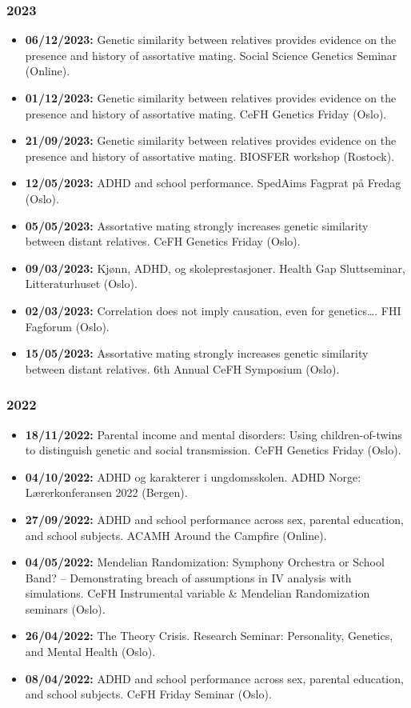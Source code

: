 \documentclass[10pt,a4paper]{article}
\begin{document}
\subsubsection*{2023}
\begin{itemize}
\item \textbf{06/12/2023:} Genetic similarity between relatives provides evidence on the presence and history of assortative mating. Social Science Genetics Seminar (Online).
\item \textbf{01/12/2023:} Genetic similarity between relatives provides evidence on the presence and history of assortative mating. CeFH Genetics Friday (Oslo).
\item \textbf{21/09/2023:} Genetic similarity between relatives provides evidence on the presence and history of assortative mating. BIOSFER workshop (Rostock).
\item \textbf{12/05/2023:} ADHD and school performance. SpedAims Fagprat på Fredag (Oslo).
\item \textbf{05/05/2023:} Assortative mating strongly increases genetic similarity between distant relatives. CeFH Genetics Friday (Oslo).
\item \textbf{09/03/2023:} Kjønn, ADHD, og skoleprestasjoner. Health Gap Sluttseminar, Litteraturhuset (Oslo).
\item \textbf{02/03/2023:} Correlation does not imply causation, even for genetics\ldots . FHI Fagforum (Oslo).
\item \textbf{15/05/2023:} Assortative mating strongly increases genetic similarity between distant relatives. 6th Annual CeFH Symposium (Oslo).
\end{itemize}

\subsubsection*{2022}
\begin{itemize}
\item \textbf{18/11/2022:} Parental income and mental disorders: Using children-of-twins to distinguish genetic and social transmission. CeFH Genetics Friday (Oslo).
\item \textbf{04/10/2022:} ADHD og karakterer i ungdomsskolen. ADHD Norge: Lærerkonferansen 2022 (Bergen).
\item \textbf{27/09/2022:} ADHD and school performance across sex, parental education, and school subjects. ACAMH Around the Campfire (Online).
\item \textbf{04/05/2022:} Mendelian Randomization: Symphony Orchestra or School Band? -- Demonstrating breach of assumptions in IV analysis with simulations. CeFH Instrumental variable \& Mendelian Randomization seminars (Oslo).
\item \textbf{26/04/2022:} The Theory Crisis. Research Seminar: Personality, Genetics, and Mental Health (Oslo).
\item \textbf{08/04/2022:} ADHD and school performance across sex, parental education, and school subjects. CeFH Friday Seminar (Oslo).
\end{itemize}
\end{document}
